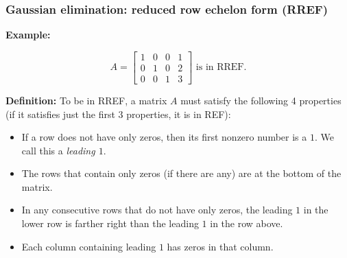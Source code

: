 \begin{frame}[fragile]
\frametitle{Gaussian elimination: reduced row echelon form (RREF)}

\textbf{Example:}


$$A = \left[ \begin{array}{cccc}
\boxed{1} & 0 & 0 & 1 \\
0 & \boxed{1} & 0 & 2 \\
0 & 0 &  \boxed{1} & 3   
\end{array} \right] \text{ is in RREF.}$$

\textbf{Definition:} To be in RREF, a matrix $A$ must satisfy the following 4 properties (if it satisfies just the first 3 properties, it is in REF):

\begin{itemize}

\item If a row does not have only zeros, then its first nonzero number is a $1$. We call this a {\em leading $1$}.

\item The rows that contain only zeros (if there are any) are at the bottom of the matrix.

\item In any consecutive rows that do not have only zeros, the leading $1$ in the lower row is farther right than the leading $1$ in the row above.

\item Each column containing leading $1$ has zeros in that column.



\end{itemize}


\end{frame}

 
